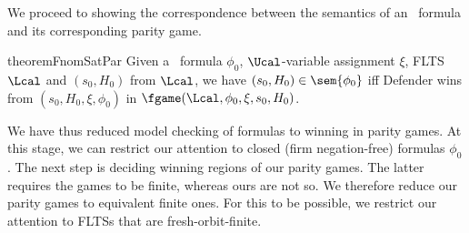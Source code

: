 
We proceed to showing the correspondence between the semantics of an \fhml\ formula and its corresponding parity game.
\begin{restatable}{theorem}{FnomSatPar}\label{thm:FnomSatPar} %
    Given a \fhml\ formula $\phi_0$,
    $\Ucal$-variable assignment $\xi$,
    FLTS $\Lcal$ and $(s_0, H_0)$ from $\Lcal$, we have $(s_0, H_0) \in \sem{\phi_0}$ iff Defender wins from $(s_0, H_0,\xi, \phi_0)$ in $\fgame(\Lcal, \phi_0, \xi, s_0,H_0)$.
\end{restatable}

We have thus reduced model checking of formulas to winning in parity games. 
At this stage, we can restrict our attention to closed (firm negation-free) formulas $\phi_0$.
The next step is deciding
winning regions of our parity games. The latter requires the games to be finite, whereas ours are not so. We therefore reduce our parity games to equivalent finite ones.
For this to be possible, we restrict our attention to FLTSs that are fresh-orbit-finite.

